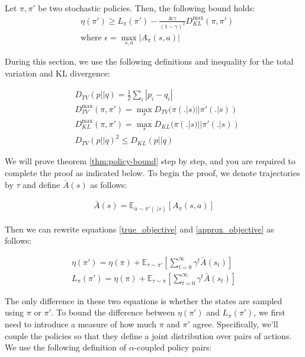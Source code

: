 \begin{theorem}\label{thm:policy-bound}
    Let $\pi, \pi'$ be two stochastic policies. Then, the following bound holds:
    \begin{align*}
    &\eta(\pi') \ge L_{\pi}(\pi') - \frac{4\epsilon\gamma}{(1-\gamma)^2}D_{KL}^{\max}(\pi, \pi') \\
    &\text{where } \epsilon = \max_{s, a} |A_{\pi}(s, a)|
    \end{align*}
\end{theorem}

During this section, we use the following definitions and inequality for the total variation and KL divergence:

\begin{align*}
    &D_{TV}(p||q) = \frac{1}{2}\sum_{i}|p_i - q_i| \\
    &D_{TV}^{\max}(\pi, \pi') = \max_{s} D_{TV}(\pi(.|s)||\pi'(.|s))\\
    &D_{KL}^{\max}(\pi, \pi') = \max_{s} D_{KL}(\pi(.|s)||\pi'(.|s))\\
    &D_{TV}(p||q)^2 \le D_{KL}(p||q)
\end{align*}

We will prove theorem \ref{thm:policy-bound} step by step, and you are required to complete the proof as indicated below. To begin the proof, we denote trajectories by $\tau$ and define $\bar{A}(s)$ as follows:

\begin{align*}
    \bar{A}(s) = \mathbb{E}_{a \sim \pi'(.|s)}[A_{\pi}(s, a)]
\end{align*}

Then we can rewrite equations \ref{true_objective} and \ref{approx_objective} as follows:

\begin{align}
    \eta(\pi') = \eta(\pi) + \mathbb{E}_{\tau \sim \pi'}[\sum_{t = 0}^{\infty}\gamma^t \bar{A}(s_t)] \\
    L_{\pi}(\pi') = \eta(\pi) + \mathbb{E}_{\tau \sim \pi}[\sum_{t = 0}^{\infty}\gamma^t \bar{A}(s_t)] 
\end{align}

The only difference in these two equations is whether the states are sampled using $\pi$ or $\pi'$. To bound the difference between $\eta(\pi')$ and $L_{\pi}(\pi')$, we first need to introduce a measure of how much $\pi$ and $\pi'$ agree. Specifically, we'll couple the policies so that they define a joint distribution over pairs of actions. We use the following definition of $\alpha$-coupled policy pairs:

